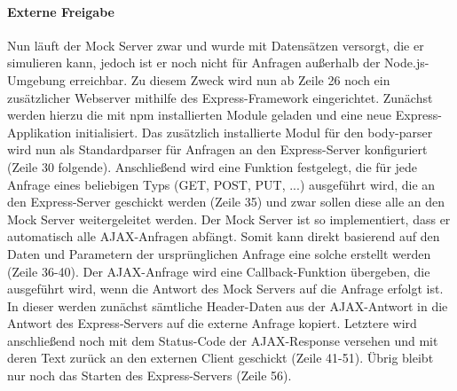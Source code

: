 \paragraph{Externe Freigabe}
Nun läuft der Mock Server zwar und wurde mit Datensätzen versorgt, die er simulieren kann, jedoch ist er noch nicht für Anfragen außerhalb der Node.js-Umgebung erreichbar.
Zu diesem Zweck wird nun ab Zeile 26 noch ein zusätzlicher Webserver mithilfe des Express-Framework eingerichtet.
Zunächst werden hierzu die mit \ac{npm} installierten Module geladen und eine neue Express-Applikation initialisiert.
Das zusätzlich installierte Modul für den body-parser wird nun als Standardparser für Anfragen an den Express-Server konfiguriert (Zeile 30 folgende).
Anschließend wird eine Funktion festgelegt, die für jede Anfrage eines beliebigen Typs (GET, POST, PUT, ...) ausgeführt wird, die an den Express-Server geschickt werden (Zeile 35) und zwar sollen diese alle an den Mock Server weitergeleitet werden.
Der Mock Server ist so implementiert, dass er automatisch alle \ac{AJAX}-Anfragen abfängt.
Somit kann direkt basierend auf den Daten und Parametern der ursprünglichen Anfrage eine solche erstellt werden (Zeile 36-40).
Der \ac{AJAX}-Anfrage wird eine Callback-Funktion übergeben, die ausgeführt wird, wenn die Antwort des Mock Servers auf die Anfrage erfolgt ist.
In dieser werden zunächst sämtliche Header-Daten aus der \ac{AJAX}-Antwort in die Antwort des Express-Servers auf die externe Anfrage kopiert.
Letztere wird anschließend noch mit dem Status-Code der \ac{AJAX}-Response versehen und mit deren Text zurück an den externen Client geschickt (Zeile 41-51).
Übrig bleibt nur noch das Starten des Express-Servers (Zeile 56).


